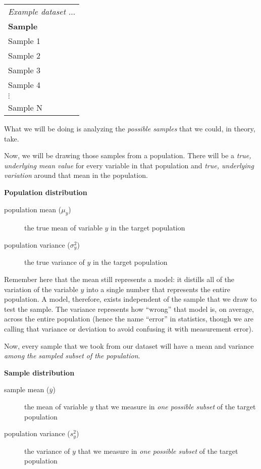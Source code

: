 \documentclass[11pt]{lecturenotes}
\begin{document}
\begin{table}[h!]
\footnotesize
\begin{tabular}{lrrr}
\multicolumn{4}{l}{\itshape Example dataset $\ldots$ } \\
\textbf{Sample} & & & \\\toprule
Sample 1 & & & \\ \midrule
Sample 2 & & & \\  \midrule
Sample 3 & & & \\ \midrule
Sample 4 & & & \\ \midrule
$\vdots$ & & & \\ \midrule
Sample N & & & \\ \bottomrule
\end{tabular}
\end{table}

What we will be doing is analyzing the \emph{possible samples} that we could, in theory, take.

Now, we will be drawing those samples from a population. There will be a \emph{true, underlying mean value} for every variable in that population and \emph{true, underlying variation} around that mean in the population. 

\slide
\textbf{Population distribution}
\begin{description}
\item[population mean ($\mu_y$)] the true mean of variable $y$ in the target population
\item[population variance ($\sigma^2_y$)] the true variance of $y$ in the target population
\end{description}

Remember here that the mean still represents a model: it distills all of the variation of the variable $y$ into a single number that represents the entire population. A model, therefore, exists independent of the sample that we draw to test the sample. The variance represents how ``wrong'' that model is, on average, across the entire population (hence the name ``error'' in statistics, though we are calling that variance or deviation to avoid confusing it with measurement error). 

Now, every sample that we took from our dataset will have a mean and variance \emph{among the sampled subset of the population}. 

\slide
\textbf{Sample distribution}
\begin{description}
\item[sample mean ($\overline{y}$)] the mean of variable $y$ that we measure in \emph{one possible subset} of the target population
\item[population variance ($s^2_y$)] the variance of $y$ that we measure in \emph{one possible subset} of the target population
\end{description}
\end{document}
